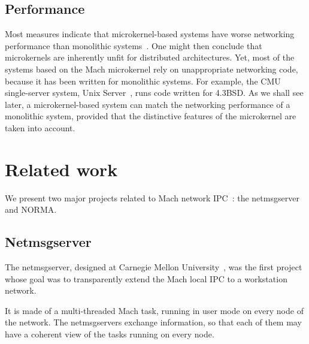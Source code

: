 \subsection{Performance}

Most measures indicate that microkernel-based systems have worse networking
performance than monolithic systems~\cite{Maeda92}. One might then conclude 
that microkernels are inherently unfit for distributed architectures.
Yet, most of the systems based on the Mach microkernel rely on unappropriate
 networking code, because it has been written for monolithic systems. For example,
the CMU single-server system, Unix Server~\cite{Golub90}, runs code written 
for 4.3BSD.
As we shall see later, a microkernel-based system can match the 
networking performance of a 
monolithic system, provided that the distinctive features of the microkernel 
are taken into account.

\section {Related work}

We present two major projects related to Mach network IPC~: the netmsgserver and NORMA. 

\subsection{Netmsgserver}

The netmsgserver, designed at Carnegie Mellon University~\cite{Sansom86}, was 
the first project whose goal was to transparently extend the Mach local IPC 
to a workstation network.

It is made of a multi-threaded Mach task, running in user mode on every node
 of the network. The netmsgservers exchange information, so that each of 
them may have a coherent view of the tasks running on every node.

